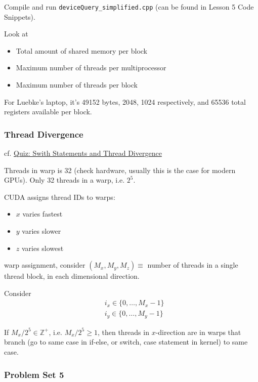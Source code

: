 \documentclass[10pt]{amsart}
\begin{document}
\begin{multicols*}{2}
Compile and run \verb|deviceQuery_simplified.cpp| (can be found in Lesson 5 Code Snippets).

Look at

\begin{itemize}
\item Total amount of shared memory per block
\item Maximum number of threads per multiprocessor  
\item Maximum number of threads per block  
\end{itemize}
  
For Luebke's laptop, it's 49152 bytes, 2048, 1024 respectively, and 65536 total registers available per block.  

\subsubsection{Thread Divergence}

cf. \href{https://classroom.udacity.com/courses/cs344/lessons/109244577/concepts/1109210790923#}{Quiz: Swith Statements and Thread Divergence}

Threads in warp is 32 (check hardware, usually this is the case for modern GPUs).  Only 32 threads in a warp, i.e. $2^5$.

CUDA assigns thread IDs to warps:

\begin{itemize}
\item $x$ varies fastest
\item $y$ varies slower
\item $z$ varies slowest
\end{itemize}
warp assignment, consider $(M_x,M_y,M_z) \equiv $ number of threads in a single thread block, in each dimensional direction.

Consider
\[
\begin{aligned}
  & i_x \in \lbrace 0 , \dots , M_x - 1 \rbrace \\ 
  & i_y \in \lbrace 0 , \dots , M_y - 1 \rbrace
  \end{aligned}
\]

If $M_x/2^5 \in \mathbb{Z}^+$, i.e. $M_x/2^5\geq 1$, then threads in $x$-direction are in warps that branch (go to same case in if-else, or switch, case statement in kernel) to same case.

\subsubsection{Problem Set 5}


\end{multicols*}
\end{document}
